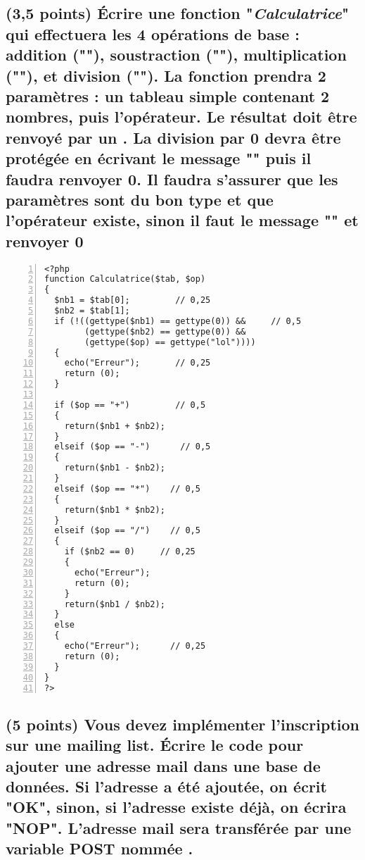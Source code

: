 \documentclass[11pt,a4paper]{article}
\begin{document}
\subsection{(3,5 points) \'Ecrire une fonction "\textit{Calculatrice}" qui effectuera les 4 opérations de base : addition ("\TTBF{+}"), soustraction ("\TTBF{-}"), multiplication ("\TTBF{*}"), et division ("\TTBF{/}"). La fonction prendra 2 paramètres : un tableau simple contenant 2 nombres, puis l'opérateur. Le résultat doit être renvoyé par un . La division par 0 devra être protégée en écrivant le message "" puis il faudra renvoyer 0. Il faudra s'assurer que les paramètres sont du bon type et que l'opérateur existe, sinon il faut le message "" et renvoyer 0}




\lstset{language=php}
\begin{lstlisting}[frame=single,numbers=left]
<?php
function Calculatrice($tab, $op)
{
  $nb1 = $tab[0];         // 0,25
  $nb2 = $tab[1];
  if (!((gettype($nb1) == gettype(0)) &&     // 0,5
        (gettype($nb2) == gettype(0)) &&
        (gettype($op) == gettype("lol"))))
  {
    echo("Erreur");       // 0,25
    return (0);
  }

  if ($op == "+")         // 0,5
  {
    return($nb1 + $nb2);
  }
  elseif ($op == "-")      // 0,5
  {
    return($nb1 - $nb2);
  }
  elseif ($op == "*")    // 0,5
  {
    return($nb1 * $nb2);
  }
  elseif ($op == "/")    // 0,5
  {
    if ($nb2 == 0)     // 0,25
    {
      echo("Erreur");
      return (0);
    }
    return($nb1 / $nb2);
  }
  else
  {
    echo("Erreur");      // 0,25
    return (0);
  }
}
?>
\end{lstlisting}

\medskip

\subsection{(5 points) Vous devez implémenter l'inscription sur une mailing list. \'Ecrire le code pour ajouter une adresse mail dans une base de données. Si l'adresse a été ajoutée, on écrit "OK", sinon, si l'adresse existe déjà, on écrira "NOP". L'adresse mail sera transférée par une variable POST nommée .}

\medskip
\end{document}
